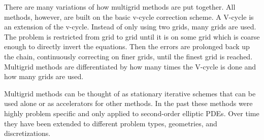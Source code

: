\documentclass[12pt]{article}
\newcommand{\ve}[1]{\ensuremath{\mathbf{#1}}}
\begin{document}
%
There are many variations of how multigrid methods are put together. All methods, however, are built on the basic v-cycle correction scheme. A V-cycle is an extension of the v-cycle. Instead of only using two grids, many grids are used. The problem is restricted from grid to grid until it is on some grid which is coarse enough to directly invert the equations. Then the errors are prolonged back up the chain, continuously correcting on finer grids, until the finest grid is reached. Multigrid methods are differentiated by how many times the V-cycle is done and how many grids are used. %
%

Multigrid methods can be thought of as stationary iterative schemes that can be used alone or as accelerators for other methods. In the past these methods were highly problem specific and only applied to second-order elliptic PDEs. Over time they have been extended to different problem types, geometries, and discretizations.%


\end{document}
